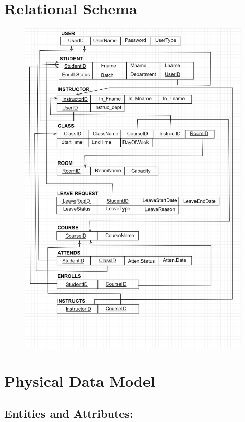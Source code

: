 \documentclass{article}
\begin{document}
\section*{\huge{Relational Schema}}
\thispagestyle{empty}
\begin{figure}[H]
    \centering
    \includegraphics[width=1.1\textwidth, center]{rel}
\end{figure}



\newpage
\section*{\huge{Physical Data Model}}

\subsection*{\LARGE{Entities and Attributes:}}
\end{document}
